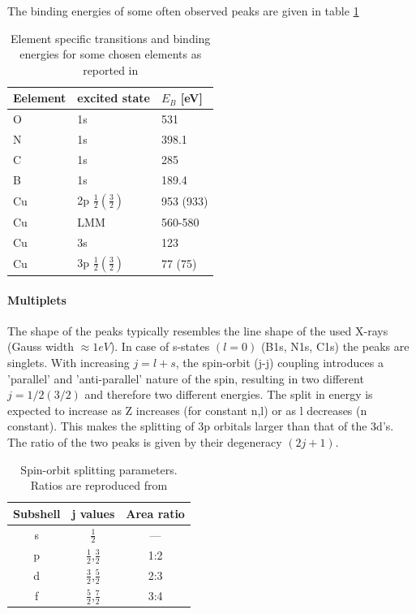 The  binding energies of some often observed peaks are given in table \ref{tab:XPS-intensities}
\begin{table}\centering
 \caption{Element specific transitions and binding energies for some chosen elements as reported in \cite{wanger_handbook_1979}}
 \begin{tabular}{lll}
  Eelement & excited state & $E_B$ [eV]\\ \hline 
  O & 1s & 531\\
  N & 1s & 398.1\\
  C & 1s & 285\\
  B & 1s & 189.4 \\
  Cu & 2p $\frac{1}{2} (\frac{3}{2})$ & 953 (933) \\
  Cu & LMM & 560-580 \\
  Cu & 3s & 123\\
  Cu & 3p $\frac{1}{2} (\frac{3}{2})$ & 77 (75)\\
 \end{tabular}
\label{tab:XPS-intensities}
\end{table}

\paragraph{Multiplets}
The shape of the peaks typically resembles the line shape of the used X-rays (Gauss width $\approx 1eV$). In case of s-states $(l=0)$ (B1s, N1s, C1s) the peaks are singlets. With increasing $j=l+s$, the spin-orbit (j-j) coupling introduces a 'parallel' and 'anti-parallel' nature of the spin, resulting in two different $j=1/2(3/2)$ and therefore two different energies. The split in energy is expected to increase as Z increases (for constant n,l) or as l decreases (n constant). This makes the splitting of 3p orbitals larger than that of the 3d's. The ratio of the two peaks is given by their degeneracy $(2j+1)$.\cite[113]{Riviere_90}
\begin{table}
\caption{Spin-orbit splitting parameters. Ratios are reproduced from \cite{Riviere_90}}
\centering
 \begin{tabular}{ccc}
 Subshell & j values & Area ratio \\ \hline
 s & $\frac{1}{2}$ & --- \\
 p & $\frac{1}{2}$,$\frac{3}{2}$ & 1:2 \\
 d & $\frac{3}{2}$,$\frac{5}{2}$ & 2:3 \\
 f & $\frac{5}{2}$,$\frac{7}{2}$ & 3:4 \\
 \end{tabular}
\end{table}


